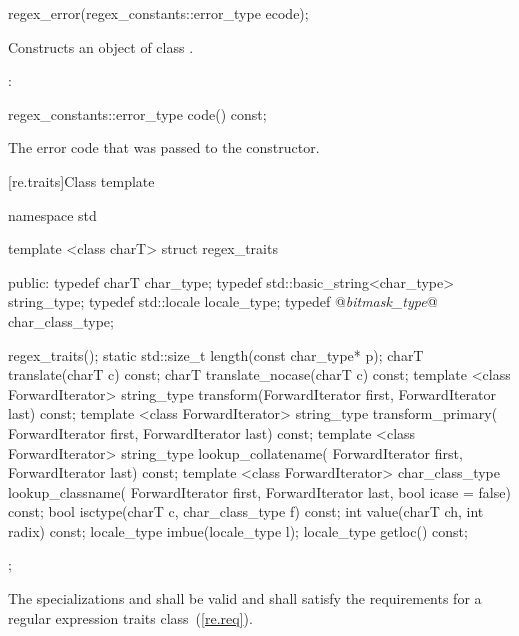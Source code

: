 %
\begin{itemdecl}
regex_error(regex_constants::error_type ecode);
\end{itemdecl}

\begin{itemdescr}
\pnum\effects  Constructs an object of class .

\pnum\postcondition:  
\end{itemdescr}

%
%
\begin{itemdecl}
regex_constants::error_type code() const;
\end{itemdecl}

\begin{itemdescr}
\pnum\returns  The error code that was passed to the constructor.
\end{itemdescr}

[re.traits]{Class template }
%
\begin{codeblock}
namespace std {
  template <class charT>
  struct regex_traits {
  public:
     typedef charT                        char_type;
     typedef std::basic_string<char_type> string_type;
     typedef std::locale                  locale_type;
     typedef @{\itshape bitmask_type}@                 char_class_type;

     regex_traits();
     static std::size_t length(const char_type* p);
     charT translate(charT c) const;
     charT translate_nocase(charT c) const;
     template <class ForwardIterator>
       string_type transform(ForwardIterator first, ForwardIterator last) const;
     template <class ForwardIterator>
       string_type transform_primary(
         ForwardIterator first, ForwardIterator last) const;
     template <class ForwardIterator>
       string_type lookup_collatename(
         ForwardIterator first, ForwardIterator last) const;
     template <class ForwardIterator>
       char_class_type lookup_classname(
         ForwardIterator first, ForwardIterator last, bool icase = false) const;
     bool isctype(charT c, char_class_type f) const;
     int value(charT ch, int radix) const;
     locale_type imbue(locale_type l);
     locale_type getloc() const;
  };
}
\end{codeblock}

\pnum
{}%
%
%
The specializations  and
 shall be valid and shall satisfy the
requirements for a regular expression traits class~(\ref{re.req}).

